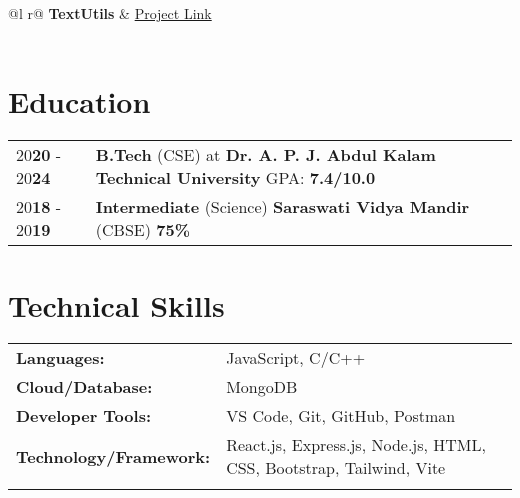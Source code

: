 \documentclass[a4paper,12pt]{article}
\begin{document}
\begin{tabularx}{\linewidth}{ @{}l r@{} }
\textbf{TextUtils} & \hfill \href{https://github.com/AshutoshSingh2021/my-First-react-app}{Project Link} \\[2.00pt]
  \\
\end{tabularx}
\section{Education}
\begin{tabularx}{\linewidth}{@{}l X@{}}	
20\textbf{20} - 20\textbf{24} & \textbf{B.Tech} (CSE) at \textbf{Dr. A. P. J. Abdul Kalam Technical University} \hfill \normalsize GPA: \textbf{7.4/10.0} \\
20\textbf{18} - 20\textbf{19} & \textbf{Intermediate} (Science) \textbf{Saraswati Vidya Mandir} (CBSE) \hfill  \textbf{75\%} \\

\end{tabularx}

\section{Technical Skills}
\begin{tabularx}{\linewidth}{@{}l X@{}}
\textbf{Languages: } &  \normalsize{JavaScript, C/C++}\\
\textbf{Cloud/Database: }  &  \normalsize{MongoDB}\\
\textbf{Developer Tools: }  &  \normalsize{VS Code, Git, GitHub, Postman}\\
\textbf{Technology/Framework: }  &  \normalsize{React.js, Express.js, Node.js, HTML, CSS, Bootstrap, Tailwind, Vite}\\
\textbf{ }  &  \normalsize{}\\
\end{tabularx}
\end{document}
